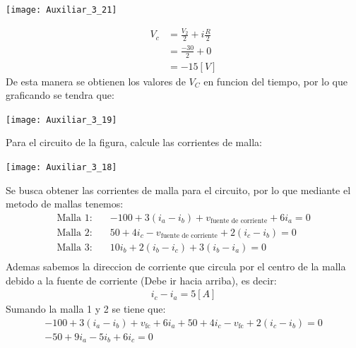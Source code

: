 \documentclass[
  11pt,
  letterpaper,
   addpoints,
   answers
  ]{exam}
\begin{document}
\begin{questions}
\begin{solution}
\begin{enumerate}
    \begin{center}
        \texttt{[image: Auxiliar\_3\_21]}
    \end{center}
    \begin{align}
        V_{c} &= \frac{V_{2}}{2} + i\frac{R}{2}\\
        &= \frac{-30}{2} + 0\\
        &= -15[V]
    \end{align} 
    De esta manera se obtienen los valores de $V_{C}$ en funcion del tiempo, por lo que graficando se tendra que:
    \begin{center}
        \texttt{[image: Auxiliar\_3\_19]}
    \end{center}
\end{enumerate}
\end{solution}
\question
    Para el circuito de la figura, calcule las corrientes de malla:
    \begin{center}
        \texttt{[image: Auxiliar\_3\_18]}
    \end{center}
\begin{solution}
    Se busca obtener las corrientes de malla para el circuito, por lo que mediante el metodo de mallas tenemos:
    \begin{align}
        \text{Malla 1:} \quad & -100 + 3(i_{a} -i_{b}) + v_{\text{fuente de corriente}} + 6i_{a} = 0\\
        \text{Malla 2:} \quad & 50 + 4i_{c} -v_{\text{fuente de corriente}} + 2(i_{c} -i_{b})= 0\\
        \text{Malla 3:} \quad & 10i_{b} + 2(i_{b} -i_{c}) + 3(i_{b} -i_{a}) = 0\\
    \end{align}
    Ademas sabemos la direccion de corriente que circula por el centro de la malla debido a la fuente de corriente (Debe ir hacia arriba), es decir:
    \begin{align}
        i_{c} - i_{a} = 5[A]
    \end{align}
    Sumando la malla 1 y 2 se tiene que:
    \begin{align}
        -100 + 3(i_{a} -i_{b}) + v_{\text{fc}} + 6i_{a} + 50 + 4i_{c} -v_{\text{fc}} + 2(i_{c} -i_{b})= 0\\
        -50 + 9i_{a} - 5i_{b} + 6i_{c} = 0\\
    \end{align}

\end{solution}
\end{questions}
\end{document}
